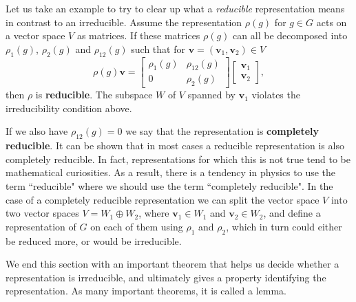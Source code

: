 \documentclass[notes.tex]{subfiles}
\begin{document}
Let us take an example to try to clear up what a {\it reducible} representation means in contrast to an irreducible. Assume the representation $\rho(g)$ for $g \in G$ acts on a vector space $V$ as matrices. If these matrices $\rho(g)$ can all be decomposed into $\rho_1(g)$, $\rho_2(g)$ and $\rho_{12}(g)$ such that for $\mathbf v =(\mathbf v_1, \mathbf v_2)\in V$ 
\[\rho(g) \mathbf v = \begin{bmatrix}\rho_1(g) & \rho_{12}(g) \\ 0 & \rho_2(g)\end{bmatrix} \begin{bmatrix}\mathbf v_1 \\ \mathbf v_2 \end{bmatrix}  ,\]
then $\rho$ is {\bf reducible}. The subspace $W$ of $V$ spanned by $\mathbf v_1$ violates the irreducibility condition above.

If  we also have $\rho_{12}(g)=0$ we say that the representation is {\bf completely reducible}. It can be shown that in most cases a reducible representation is also completely reducible. In fact, representations for which this is not true tend to be mathematical curiosities. As a result, there is a tendency in physics to use the term ``reducible" where we should use the term ``completely reducible". In the case of a completely reducible representation we can split the vector space $V$ into two vector spaces $V=W_1\oplus W_2$, where $\mathbf v_1\in W_1$ and $\mathbf v_2\in W_2$, and define a representation of $G$ on each of them using $\rho_1$ and $\rho_2$, which in turn could either be reduced more, or would be irreducible.

We end this section with an important theorem that helps us decide whether a representation is irreducible, and ultimately gives a property identifying the representation. As many important theorems, it is called a lemma.
%
%
\end{document}
